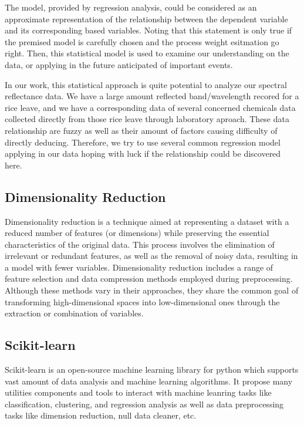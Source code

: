 The model, provided by regression analysis, could be considered as an approximate representation
of the relationship between the dependent variable and its corresponding based variables.
Noting that this statement is only true if the premised model is carefully chosen
and the process weight esitmation go right.
Then, this statistical model is used to examine our understanding on the data,
or applying in the future anticipated of important events.

In our work, this statistical approach is quite potential to analyze our spectral reflectance data.
We have a large amount reflected band/wavelength recored for a rice leave,
and we have a corresponding data of several concerned chemicals data collected directly
from those rice leave through laboratory aproach.
These data relationship are fuzzy
as well as their amount of factors causing difficulty of directly deducing.
Therefore, we try to use several common regression model applying in our data
hoping with luck if the relationship could be discovered here.

\subsection{Dimensionality Reduction}
Dimensionality reduction is a technique aimed at representing a dataset with a reduced number of features (or dimensions) while preserving the essential characteristics of the original data. This process involves the elimination of irrelevant or redundant features, as well as the removal of noisy data, resulting in a model with fewer variables. Dimensionality reduction includes a range of feature selection and data compression methods employed during preprocessing. Although these methods vary in their approaches, they share the common goal of transforming high-dimensional spaces into low-dimensional ones through the extraction or combination of variables.

\subsection{Scikit-learn}
Scikit-learn is an open-source machine learning library for python
which supports vast amount of data analysis and machine learning algorithms.
It propose many utilities components and tools to interact with machine leanring tasks
like classification, clustering, and regression analysis
as well as data preprocessing tasks like dimension reduction, null data cleaner, etc.

